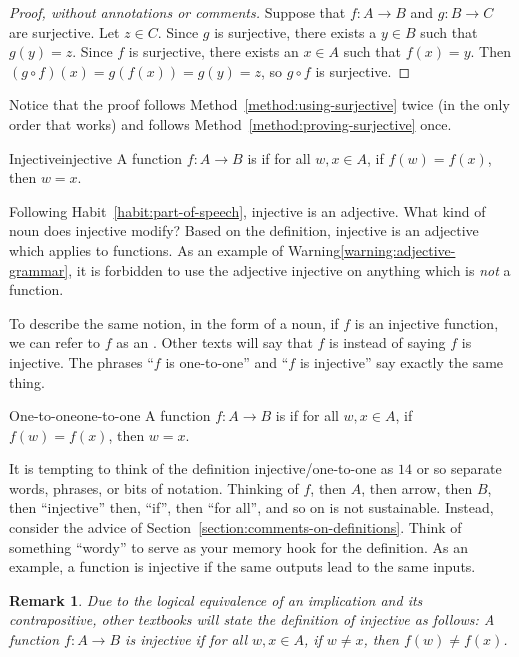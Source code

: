 \documentclass{book}
\newcounter{ekcounter}%
\theoremstyle{ekimcustom}
\newtheorem{remark}[ekcounter]{Remark}
\newcommand\defn[1]{{\color{blue}{\bf #1}}}
\begin{document}
\begin{proof}[Proof, without annotations or comments]
Suppose that $f : A \to B$ and $g: B \to C$ are surjective. Let $z \in C$. Since $g$ is surjective, there exists a $y \in B$ such that $g(y)=z$. Since $f$ is surjective, there exists an $x \in A$ such that $f(x)=y$. Then $(g \circ f)(x)= g(f(x))= g(y)=z$, so $g \circ f$ is surjective.
\end{proof}
Notice that the proof follows Method~\ref{method:using-surjective} twice (in the only order that works) and follows Method~\ref{method:proving-surjective} once.

\begin{bdefinition}{Injective}{injective}
A function $f : A \to B$ is \defn{injective} if for all $w, x \in A$, if $f(w)=f(x)$, then $w=x$.
\end{bdefinition}
Following Habit~\ref{habit:part-of-speech}, injective is an adjective. What kind of noun does injective modify? Based on the definition, injective is an adjective which applies to functions. As an example of Warning\ref{warning:adjective-grammar}, it is forbidden to use the adjective injective on anything which is \emph{not} a function.

To describe the same notion, in the form of a noun, if $f$ is an injective function, we can refer to $f$ as an \defn{injection}. Other texts will say that $f$ is \defn{one-to-one} instead of saying $f$ is injective. The phrases ``$f$ is one-to-one'' and ``$f$ is injective'' say exactly the same thing.
\begin{bdefinition}{One-to-one}{one-to-one}
A function $f : A \to B$ is \defn{one-to-one} if for all $w, x \in A$, if $f(w)=f(x)$, then $w=x$.
\end{bdefinition}

\begin{bhabit}{}{}
It is tempting to think of the definition injective/one-to-one as $14$ or so separate words, phrases, or bits of notation. Thinking of $f$, then $A$, then arrow, then $B$, then ``injective'' then, ``if'', then ``for all'', and so on is not sustainable. Instead, consider the advice of Section~\ref{section:comments-on-definitions}. Think of something ``wordy'' to serve as your memory hook for the definition. As an example, a function is injective if the same outputs lead to the same inputs.
\end{bhabit}

\begin{remark}
Due to the logical equivalence of an implication and its contrapositive, other textbooks will state the definition of injective as follows: A function $f : A \to B$ is injective if for all $w, x \in A$, if $w \not= x$, then $f(w)\not=f(x)$.
\end{remark}
\end{document}
